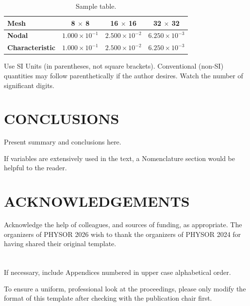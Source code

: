 \documentclass[letterpaper]{physor2026}
\begin{document}
\begin{table}[!ht]
    \centering
    \caption{Sample table.}
    \begin{tabular}{lccc}
        \toprule
         \textbf{Mesh}           & \textbf{8 $\times$ 8} & \textbf{16 $\times$ 16} & \textbf{32 $\times$ 32} \\ \midrule
         \textbf{Nodal}          & $1.000\times 10^{-1}$ & $2.500\times 10^{-2}$ & $6.250\times 10^{-3}$ \\ \midrule
         \textbf{Characteristic} & $1.000\times 10^{-1}$ & $2.500\times 10^{-2}$ & $6.250\times 10^{-3}$ \\ \bottomrule
    \end{tabular}
    
    \label{tab:sample}
\end{table}

Use SI Units (in parentheses, not square brackets).  Conventional (non-SI) quantities may follow parenthetically if the author desires.  Watch the number of significant digits.

\section{CONCLUSIONS}
Present summary and conclusions here.

\printnomenclature 
If variables are extensively used in the text, a Nomenclature section would be helpful to the reader.


\section*{ACKNOWLEDGEMENTS}
Acknowledge the help of colleagues, and sources of funding, as appropriate. 
The organizers of PHYSOR 2026 wish to thank the organizers of PHYSOR 2024 for having shared their original template.






\appendix

\section{}
If necessary, include Appendices numbered in upper case alphabetical order.

To ensure a uniform, professional look at the proceedings, please only modify the format of this template after checking with the publication chair first.
\end{document}
